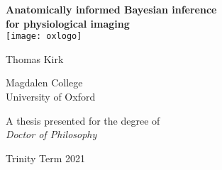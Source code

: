 \documentclass[12pt]{report}
\begin{document}
\begin{titlepage}
   \begin{center}

       \textbf{\LARGE Anatomically informed Bayesian inference\\for physiological imaging\\}
       \vspace{2cm}
       \texttt{[image: oxlogo]}

		\vfill
       {\Large Thomas Kirk}
        \vspace{0.4cm}

       {\large Magdalen College\\}
       {\large University of Oxford\\}

       \vfill
            
       A thesis presented for the degree of\\
       \textit{Doctor of Philosophy}\\
       \vspace{0.8cm}

       Trinity Term 2021
            
   \end{center}
\end{titlepage}


\tableofcontents


\newpage
\pagestyle{fancy}
\fancyhf{}
\setlength{\headheight}{14.49998pt}
\fancyhead[OL]{\itshape\nouppercase{\leftmark}}
\fancyhead[OR]{\thepage}
\doublespacing 









\singlespacing



\end{document}
